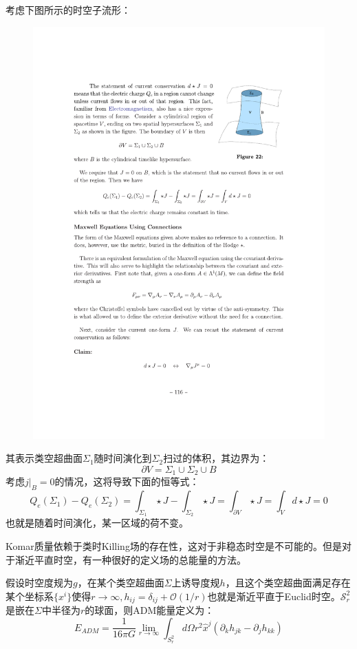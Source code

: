 考虑下图所示的时空子流形：
\begin{figure}[H]
	\centering
	\includegraphics{figs/fig5.pdf}
\end{figure}
\noindent 其表示类空超曲面$\Sigma_1$随时间演化到$\Sigma_2$扫过的体积，其边界为：
\[\partial V=\Sigma_1\cup\Sigma_2\cup B\]
考虑$j|_B=0$的情况，这将导致下面的恒等式：
\begin{equation}
	Q_e(\Sigma_1)-Q_e(\Sigma_2)=\int_{\Sigma_1}\star J-\int_{\Sigma_2}\star J=\int_{\partial V}\star J=\int_Vd\star J=0
\end{equation}
也就是随着时间演化，某一区域的荷不变。

Komar质量依赖于类时Killing场的存在性，这对于非稳态时空是不可能的。但是对于渐近平直时空，有一种很好的定义场的总能量的方法。
\begin{definition}[ADM能量]
	假设时空度规为$g$，在某个类空超曲面$\Sigma$上诱导度规$h$，且这个类空超曲面满足存在某个坐标系$\{x^i\}$使得$r\to\infty ,h_{ij}=\delta_{ij}+\mathcal{O}(1/r)$也就是渐近平直于Euclid时空。$\mathcal{S}^2_r$是嵌在$\Sigma$中半径为$r$的球面，则ADM能量定义为：
	\begin{equation}
		\boxed{
			E_{ADM}=\dfrac{1}{16\pi G}\lim_{r\longrightarrow\infty}\int_{S_{r}^{2}}d\Omega r^{2}\hat{x}^{j}(\partial_{k}h_{jk}-\partial_{j}h_{kk})
		}
	\end{equation}
\end{definition}

